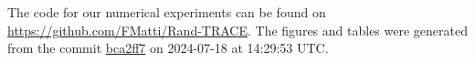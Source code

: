 The code for our numerical experiments can be found on \url{https://github.com/FMatti/Rand-TRACE}. The figures and tables were generated from the commit \href{https://github.com/FMatti/Rand-TRACE/tree/bca2ff7}{bca2ff7} on 2024-07-18 at 14:29:53 UTC.

